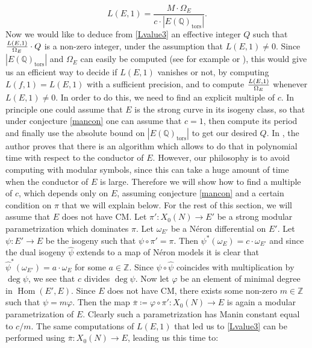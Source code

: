 \documentclass[11pt]{amsart}
\theoremstyle{definition}
\begin{document}
			\begin{equation}\label{Lvalue3}
    				L(E,1)=\frac{M\cdot \Omega_E}{c\cdot |E({\mathbb{Q}})_{\text{tors}}|}.
		\end{equation}	
		Now we would like to deduce from \eqref{Lvalue3} an effective integer $Q$ such that ${\displaystyle}\frac{L(E,1)}{\Omega_E}\cdot Q$ is a non-zero integer, under the assumption that $L(E,1)\neq 0$. Since  $|E({\mathbb{Q}})_{\text{tors}}|$ and $\Omega_E$ can easily be computed (see for example \cite[Algorithm 7.4.7]{coh} or \cite{creto}), this would give us an efficient way to decide if $L(E,1)$ vanishes or not, by computing $L(f,1)=L(E,1)$ with a sufficient precision, and to compute ${\displaystyle}\frac{L(E,1)}{\Omega_E}$ whenever $L(E,1)\neq 0$. In order to do this, we need to find an explicit multiple of $c$. In principle one could assume that $E$ is the strong curve in its isogeny class, so that under conjecture \ref{mancon} one can assume that $c=1$, then compute its period and finally use the absolute bound on $|E({\mathbb{Q}})_{\text{tors}}|$ to get our desired $Q$. In \cite{gold}, the author proves that there is an algorithm which allows to do that in polynomial time with respect to the conductor of $E$. However, our philosophy is to avoid computing with modular symbols, since this can take a huge amount of time when the conductor of $E$ is large. Therefore we will show how to find a multiple of $c$, which depends only on $E$, assuming conjecture \ref{mancon} and a certain condition on $\pi$ that we will explain below. For the rest of this section, we will assume that $E$ does not have CM. Let $\pi'\colon X_0(N)\to E'$ be a strong modular parametrization which dominates $\pi$. Let $\omega_{E'}$ be a N\'{e}ron differential on $E'$. Let $\psi\colon E'\to E$ be the isogeny such that $\psi\circ\pi'=\pi$. Then $\psi^*(\omega_E)=c\cdot \omega_{E'}$ and since the dual isogeny $\widehat{\psi}$ extends to a map of N\'{e}ron models it is clear that $\widehat{\psi}^*(\omega_{E'})=a\cdot\omega_E$ for some $a\in {\mathbb{Z}}$. Since $\psi\circ \widehat{\psi}$ coincides with multiplication by $\deg\psi$, we see that $c$ divides $\deg\psi$. Now let $\varphi$ be an element of minimal degree in $\operatorname{Hom}(E',E)$. Since $E$ does not have CM, there exists some non-zero $m\in \mathbb Z$ such that $\psi=m\varphi$. Then the map $\overline{\pi}\coloneqq\varphi\circ\pi'\colon X_0(N)\to E$ is again a modular parametrization of $E$. Clearly such a parametrization has Manin constant equal to $c/m$. The same computations of $L(E,1)$ that led us to \eqref{Lvalue3} can be performed using $\overline{\pi}\colon X_0(N)\to E$, leading us this time to:
\end{document}
